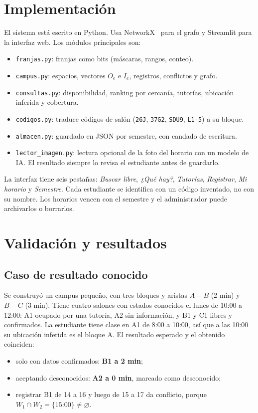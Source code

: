 \documentclass[conference,a4paper]{IEEEtran}
\begin{document}
\section{Implementación}
El sistema está escrito en Python. Usa NetworkX~\cite{networkx} para el grafo y
Streamlit para la interfaz web. Los módulos principales son:
\begin{itemize}
  \item \texttt{franjas.py}: franjas como bits (máscaras, rangos, conteo).
  \item \texttt{campus.py}: espacios, vectores $O_e$ e $I_e$, registros, conflictos y
  grafo.
  \item \texttt{consultas.py}: disponibilidad, ranking por cercanía, tutorías,
  ubicación inferida y cobertura.
  \item \texttt{codigos.py}: traduce códigos de salón (\texttt{26J}, \texttt{37G2},
  \texttt{SDU9}, \texttt{L1-5}) a su bloque.
  \item \texttt{almacen.py}: guardado en JSON por semestre, con candado de escritura.
  \item \texttt{lector\_imagen.py}: lectura opcional de la foto del horario con un
  modelo de IA. El resultado siempre lo revisa el estudiante antes de guardarlo.
\end{itemize}

La interfaz tiene seis pestañas: \emph{Buscar libre}, \emph{¿Qué hay?},
\emph{Tutorías}, \emph{Registrar}, \emph{Mi horario} y \emph{Semestre}. Cada
estudiante se identifica con un código inventado, no con su nombre. Los horarios vencen
con el semestre y el administrador puede archivarlos o borrarlos.

\section{Validación y resultados}

\subsection{Caso de resultado conocido}
Se construyó un campus pequeño, con tres bloques y aristas $A\!-\!B$ (2 min) y
$B\!-\!C$ (3 min). Tiene cuatro salones con estados conocidos el lunes de 10:00 a
12:00: A1 ocupado por una tutoría, A2 sin información, y B1 y C1 libres y
confirmados. La estudiante tiene clase en A1 de 8:00 a 10:00, así que a las 10:00 su
ubicación inferida es el bloque A. El resultado esperado y el obtenido coinciden:
\begin{itemize}
  \item solo con datos confirmados: \textbf{B1 a 2 min};
  \item aceptando desconocidos: \textbf{A2 a 0 min}, marcado como desconocido;
  \item registrar B1 de 14 a 16 y luego de 15 a 17 da conflicto, porque
  $W_1\cap W_2=\{15\text{:}00\}\neq\varnothing$.
\end{itemize}
\end{document}

